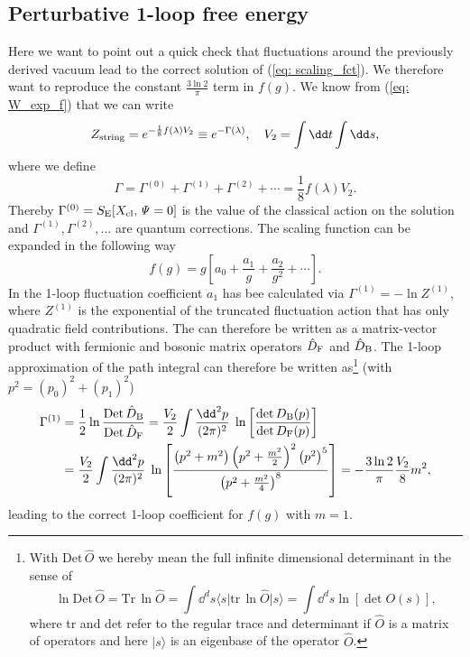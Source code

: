 \subsection{Perturbative 1-loop free energy}
Here we want to point out a quick check that fluctuations around the previously derived vacuum lead to the correct solution of (\ref{eq: scaling_fct}). We therefore want to reproduce the constant $\frac{3\ln 2}{\pi}$ term in $f(g)$. We know from (\ref{eq: W_exp_f}) that we can write
%
%
\begin{equation}
Z_{\rm string} = e^{-\frac{1}{8}f(\lambda)V_{2}} \equiv e^{-\Gamma(\lambda)}, \quad V_{2}=\int \dd t \int \dd s,
\end{equation}
%
%
where we define 
%
%
\begin{equation}
\Gamma = \Gamma^{(0)} + \Gamma^{(1)}+\Gamma^{(2)}+\cdots = \frac{1}{8}f(\lambda)V_{2}.
\end{equation}
%
%
Thereby $\Gamma^{(0)}=S_{\rm E}[X_{\rm cl},\mathit{\Psi}=0]$ is the value of the classical action on the solution and $\Gamma^{(1)},\Gamma^{(2)},\ldots$ are quantum corrections. The scaling function can be expanded in the following way
%
%
\begin{equation}
f(g) = g \left[ a_{0} + \frac{a_{1}}{g} + \frac{a_{2}}{g^{2}} + \cdots \right].
\end{equation}
%
%
In \cite{Giombi:2009gd} the 1-loop fluctuation coefficient $a_{1}$ has bee calculated via $\Gamma^{(1)}=-\ln Z^{(1)}$, where $Z^{(1)}$ is the exponential of the truncated fluctuation action that has only quadratic field contributions. The  can therefore be written as a matrix-vector product with fermionic and bosonic matrix operators $\hat{D}_{\rm F}$ and $\hat{D}_{\rm B}$. The 1-loop approximation of the path integral can therefore be written as\footnote{With $\text{Det}\,\hat{O}$ we hereby mean the full infinite dimensional determinant in the sense of
\begin{equation*}
\ln \text{Det}\,\hat{O} = \text{Tr}\,\ln \hat{O} = \int \dd^{d}s \langle s\vert \text{tr}\,\ln\hat{O} \vert s \rangle
=\int \dd^{d}s \ln[\det O(s) ] ,
\end{equation*}
where tr and det refer to the regular trace and determinant if $\hat{O}$ is a matrix of operators and here $\vert s \rangle$ is an eigenbase of the operator $\hat{O}$.} (with $p^{2} = (p_{0})^{2}+(p_{1})^{2}$)
%
%
\begin{align}
\Gamma^{(1)} &= \frac{1}{2} \ln \frac{\text{Det}\, \hat{D}_{\rm B}}{\text{Det}\,\hat{D}_{\rm F}}
=  \frac{V_{2}}{2} \int \frac{\dd^{2}p}{(2\pi)^{2}} \; \ln \left[\frac{\det D_{\rm B}(p)}{\det D_{\rm F}(p)} \right]
\label{eq: 1_loop}      \\
%
%
&= \frac{V_{2}}{2} \int \frac{\dd^{2}p}{(2\pi)^{2}} \; \ln \left[ \frac{\left(p^{2} +m^{2}\right) \left( p^{2} +\frac{m^{2}}{2}\right)^{2} \left(p^{2}\right)^{5}}{\left( p^{2} + \frac{m^{2}}{4}\right)^{8}} \right]
=-\frac{3 \ln 2}{\pi} \frac{V_{2}}{8}m^{2},   \notag
\end{align}
%
%
leading to the correct 1-loop coefficient for $f(g)$ with $m=1$.